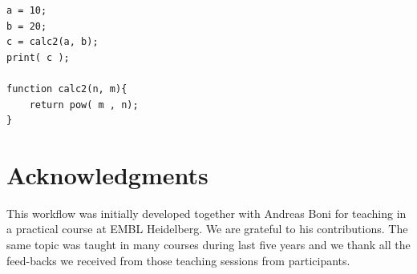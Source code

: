 \begin{lstlisting}
a = 10;
b = 20;
c = calc2(a, b);
print( c );

function calc2(n, m){
	return pow( m , n);
}
\end{lstlisting}


\section{Acknowledgments}

This workflow was initially developed together with Andreas Boni for teaching in a practical course at EMBL Heidelberg. We are grateful to his contributions. The same topic was taught in many courses during last five years and we thank all the feed-backs we received from those teaching sessions from participants.   














